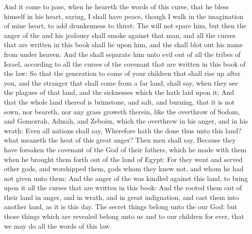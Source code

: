 \begin{biblechapter}
\verse And it come to pass, when he heareth the words of this curse, that he bless himself in his heart, saying, I shall have peace, though I walk in the imagination of mine heart, to add drunkenness to thirst:
\verse The \LORD will not spare him, but then the anger of the \LORD and his jealousy shall smoke against that man, and all the curses that are written in this book shall lie upon him, and the \LORD shall blot out his name from under heaven.
\verse And the \LORD shall separate him unto evil out of all the tribes of Israel, according to all the curses of the covenant that are written in this book of the law:
\verse So that the generation to come of your children that shall rise up after you, and the stranger that shall come from a far land, shall say, when they see the plagues of that land, and the sicknesses which the \LORD hath laid upon it;
\verse And that the whole land thereof is brimstone, and salt, and burning, that it is not sown, nor beareth, nor any grass groweth therein, like the overthrow of Sodom, and Gomorrah, Admah, and Zeboim, which the \LORD overthrew in his anger, and in his wrath:
\verse Even all nations shall say, Wherefore hath the \LORD done thus unto this land? what meaneth the heat of this great anger?
\verse Then men shall say, Because they have forsaken the covenant of the \LORD God of their fathers, which he made with them when he brought them forth out of the land of Egypt:
\verse For they went and served other gods, and worshipped them, gods whom they knew not, and whom he had not given unto them:
\verse And the anger of the \LORD was kindled against this land, to bring upon it all the curses that are written in this book:
\verse And the \LORD rooted them out of their land in anger, and in wrath, and in great indignation, and cast them into another land, as it is this day.
\verse The secret things belong unto the \LORD our God: but those things which are revealed belong unto us and to our children for ever, that we may do all the words of this law.
\end{biblechapter}

